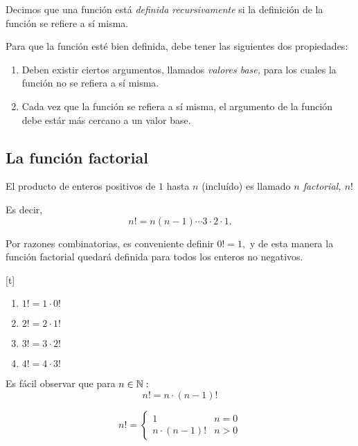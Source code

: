 	Decimos que una función está \emph{definida recursivamente} si la definición de la función se refiere a sí misma.



	Para que la función est\'e bien definida, debe tener las siguientes dos propiedades:
	\begin{enumerate}
		\item Deben existir ciertos argumentos, llamados \emph{valores base,} para los cuales la función no se refiera a sí misma.
		\item Cada vez que la función se refiera a sí misma, el argumento de la función debe estár más cercano a un valor base.
	\end{enumerate}
	


\subsection{La función factorial}


	El producto de enteros positivos de $1$ hasta $n$ (incluído) es llamado \emph{$n$ factorial, $n!$}
	
	Es decir, 
	$$
	n!=n(n-1)\cdots 3\cdot 2 \cdot 1.$$
	



	Por razones combinatorias, es conveniente definir \emph{$0!=1,$} y de esta manera la función factorial quedará definida para todos los enteros no negativos.


[t]
	\begin{rem}
		\begin{enumerate}
			\item $1!=1\cdot0!$
			\item $2!=2\cdot1!$
			\item $3!=3\cdot2!$
			\item $4!=4\cdot3!$
		\end{enumerate}
		
	\end{rem}
	



	Es fácil observar que para $n \in \mathbb{N}:$
	$$
	n!=n\cdot (n-1)!
	$$



	\begin{defn}
		$$n!=
		\begin{cases}
			1 & n=0 \\
			n\cdot(n-1)! & n>0
		\end{cases}
		$$
	\end{defn}
	



